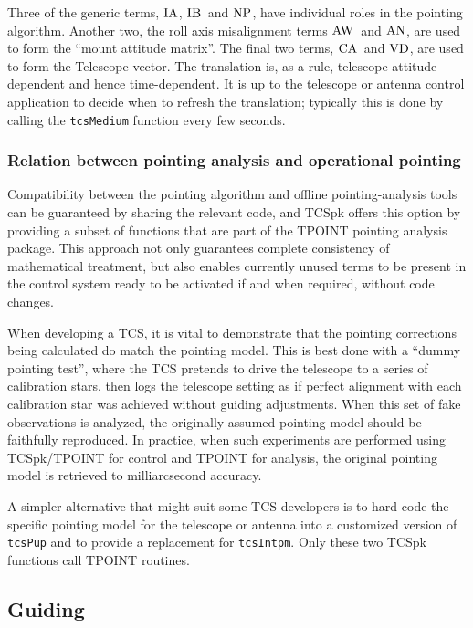 \documentclass[12pt,fleqn,twoside]{article}
\renewcommand{\_}{{\tt\char'137}}     %
\newcommand{\ia}         {{\rm IA}}
\newcommand{\ib}         {{\rm IB}}
\newcommand{\vd}         {{\rm VD}}
\newcommand{\ca}         {{\rm CA}}
\newcommand{\np}         {{\rm NP}}
\newcommand{\aw}         {{\rm AW}}
\newcommand{\an}         {{\rm AN}}
\newcommand{\iatx}       {$\ia$}
\newcommand{\ibtx}       {$\ib$}
\newcommand{\vdtx}       {$\vd$}
\newcommand{\catx}       {$\ca$}
\newcommand{\nptx}       {$\np$}
\newcommand{\awtx}       {$\aw$}
\newcommand{\antx}       {$\an$}
\begin{document}
Three of the generic terms, \iatx, \ibtx\ and \nptx, have
individual roles in the pointing algorithm.  Another two, the roll
axis misalignment terms \awtx\ and \antx, are used to form the
``mount attitude matrix''.  The final two terms,
\catx\ and \vdtx, are used to form the {\sc Telescope} vector.  The
translation is, as a rule,
telescope-attitude-dependent and hence time-dependent. It is up
to the telescope or antenna
control application to decide when to refresh
the translation;  typically this is done by calling the
{\tt tcsMedium} function every few seconds.

\subsubsection{Relation between pointing analysis and operational pointing}

Compatibility between the pointing algorithm and offline
pointing-analysis tools can be guaranteed by sharing the relevant
code, and TCSpk offers this option by providing a subset of
functions that are part of the TPOINT pointing analysis package.
This approach not only guarantees complete consistency of mathematical
treatment, but also enables currently unused terms to be present
in the control system ready to be activated if and when required,
without code changes.

When developing a TCS, it is vital to demonstrate that the pointing
corrections being calculated do match the pointing model.  This is
best done with a ``dummy pointing test'', where the TCS pretends to
drive the telescope to a series of calibration stars, then logs
the telescope setting as if perfect alignment with each calibration
star was achieved without guiding adjustments.  When this set of
fake observations is analyzed, the originally-assumed
pointing model should be faithfully reproduced.  In practice, when
such experiments are performed using TCSpk/TPOINT for control and
TPOINT for analysis, the original pointing model is retrieved to
milliarcsecond accuracy.

A simpler alternative that might suit some TCS developers is to
hard-code the specific pointing model for the telescope or antenna
into a customized version of {\tt tcsPup} and to provide a
replacement for {\tt tcsIntpm}.  Only these two TCSpk functions
call TPOINT routines.

\subsection{Guiding}
\end{document}
